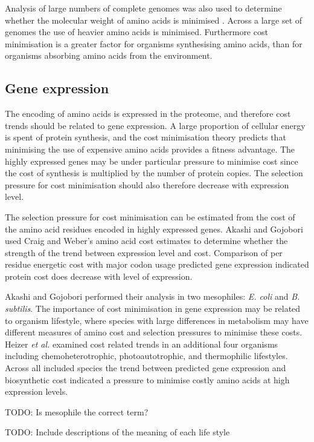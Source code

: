 Analysis of large numbers of complete genomes was also used to determine whether the molecular weight of amino acids is minimised \cite{seligmann2003}. Across a large set of genomes the use of heavier amino acids is minimised. Furthermore cost minimisation is a greater factor for organisms synthesising amino acids, than for organisms absorbing amino acids from the environment.

\subsection{Gene expression}

The encoding of amino acids is expressed in the proteome, and therefore cost trends should be related to gene expression. A large proportion of cellular energy is spent of protein synthesis, and the cost minimisation theory predicts that minimising the use of expensive amino acids provides a fitness advantage. The highly expressed genes may be under particular pressure to minimise cost since the cost of synthesis is multiplied by the number of protein copies. The selection pressure for cost minimisation should also therefore decrease with expression level.

The selection pressure for cost minimisation can be estimated from the cost of the amino acid residues encoded in highly expressed genes. Akashi and Gojobori \cite{akashi2002} used Craig and Weber's amino acid cost estimates \cite{craig1998} to determine whether the strength of the trend between expression level and cost. Comparison of per residue energetic cost with major codon usage predicted gene expression \cite{kanaya1999} indicated protein cost does decrease with level of expression.

Akashi and Gojobori performed their analysis in two mesophiles: \emph{E. coli} and \emph{B. subtilis}. The importance of cost minimisation in gene expression may be related to organism lifestyle, where species with large differences in metabolism may have different measures of amino cost and selection pressures to minimise these costs. Heizer \emph{et al.} \cite{heizer2006} examined cost related trends in an additional four organisms including chemoheterotrophic, photoautotrophic, and thermophilic lifestyles. Across all included species the trend between predicted gene expression and biosynthetic cost indicated a pressure to minimise costly amino acids at high expression levels.

TODO: Is mesophile the correct term?

TODO: Include descriptions of the meaning of each life style


